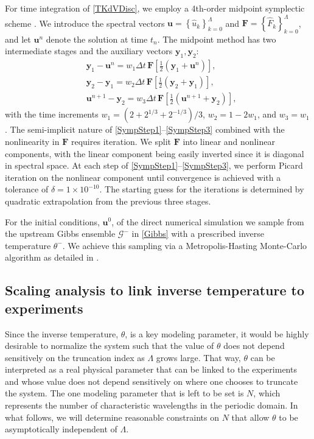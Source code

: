 \documentclass[11pt]{article}
\newcommand{\lamfac}{N}
\newcommand{\uhat}{\hat{u}}
\newcommand{\Gibbs}{\mathcal{G}}
\newcommand{\Gup}{\Gibbs^{-}}
\newcommand{\thup}{\theta^{-}}
\newcommand{\RHS}{F}
\newcommand{\RHSh}{\hat{\RHS}}
\newcommand{\uhvec}{\mathbf{u}}
\newcommand{\RHSvec}{\mathbf{F}}
\begin{document}
For time integration of \eqref{TKdVDisc}, we employ a 4th-order midpoint symplectic scheme \cite{mclachlan1993symplectic}. We introduce the spectral vectors $\uhvec = \left\{ \uhat_{k}\right\}_{k=0}^{\Lambda}$ and $\RHSvec = \left\{ \RHSh_{k} \right\}_{k=0}^{\Lambda}$, and let $\uhvec^n$ denote the solution at time $t_n$. The midpoint method has two intermediate stages and the auxiliary vectors $\mathbf{y}_{1},\mathbf{y}_{2}$:
\begin{align}
\label{SympStep1}
&\mathbf{y}_{1} - \uhvec^n = w_{1}\Delta t \, \RHSvec
\left[ \frac{1}{2}  \left(\mathbf{y}_{1} + \uhvec^n \right) \right] ,\\
&\mathbf{y}_{2}-\mathbf{y}_{1} = w_{2}\Delta t \, \RHSvec
\left[ \frac{1}{2} \left(\mathbf{y}_{2} + \mathbf{y}_{1}\right) \right] ,\\
\label{SympStep3}
&\uhvec^{n+1}-\mathbf{y}_{2} = w_{3}\Delta t \, \RHSvec
\left[ \frac{1}{2} \left( \uhvec^{n+1} + \mathbf{y}_{2}\right) \right] ,
\end{align}
with the time increments $w_{1}=\left(2+2^{1/3}+2^{-1/3}\right)/3$, $w_{2}=1-2w_{1}$, and $w_{3}=w_{1}$. The semi-implicit nature of \eqref{SympStep1}--\eqref{SympStep3} combined with the nonlinearity in $\RHSvec$ requires iteration. We split $\RHSvec$ into linear and nonlinear components, with the linear component being easily inverted since it is diagonal in spectral space. At each step of \eqref{SympStep1}--\eqref{SympStep3}, we perform Picard iteration on the nonlinear component until convergence is achieved with a tolerance of $\delta = 1\times10^{-10}$. The starting guess for the iterations is determined by quadratic extrapolation from the previous three stages.

	For the initial conditions, $\uhvec^0$, of the direct numerical simulation we sample from the upstream Gibbs ensemble $\Gup$ in \eqref{Gibbs} with a prescribed inverse temperature $\thup$. We achieve this sampling via a Metropolis-Hasting Monte-Carlo algorithm as detailed in \cite{majda2019}. 


\subsection{Scaling analysis to link inverse temperature to experiments}

	Since the inverse temperature, $\theta$, is a key modeling parameter, it would be highly desirable to normalize the system such that the value of $\theta$ does not depend sensitively on the truncation index as $\Lambda$ grows large. That way, $\theta$ can be interpreted as a real physical parameter that can be linked to the experiments and whose value does not depend sensitively on where one chooses to truncate the system. The one modeling parameter that is left to be set is $\lamfac$, which represents the number of characteristic wavelengths in the periodic domain. In what follows, we will determine reasonable constraints on $\lamfac$ that allow $\theta$ to be asymptotically independent of $\Lambda$.
	
\end{document}
